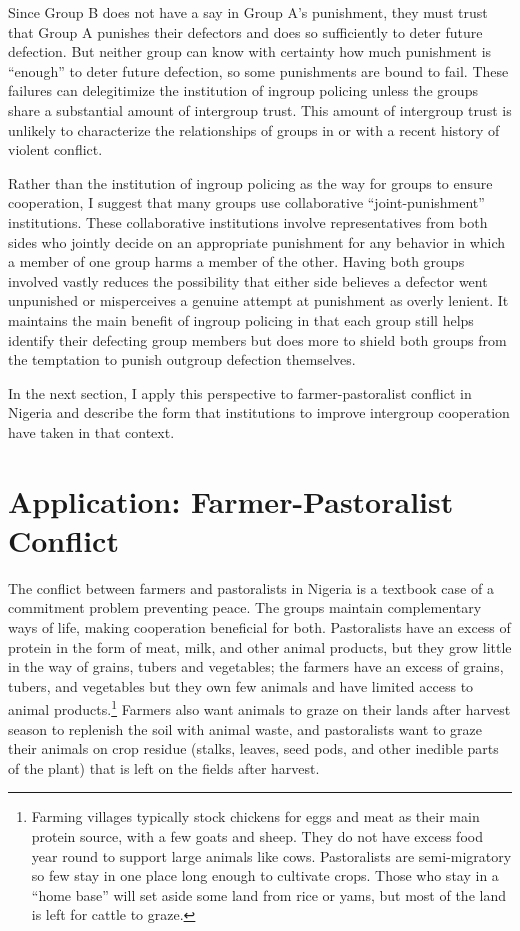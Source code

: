 \documentclass[11pt]{article}
\begin{document}
Since Group B does not have a say in Group A's punishment, they must
trust that Group A punishes their defectors and does so sufficiently to
deter future defection. But neither group can know with certainty how
much punishment is ``enough'' to deter future defection, so some
punishments are bound to fail. These failures can delegitimize the
institution of ingroup policing unless the groups share a substantial
amount of intergroup trust. This amount of intergroup trust is unlikely
to characterize the relationships of groups in or with a recent history
of violent conflict.

Rather than the institution of ingroup policing as the way for groups to
ensure cooperation, I suggest that many groups use collaborative
``joint-punishment'' institutions. These collaborative institutions
involve representatives from both sides who jointly decide on an
appropriate punishment for any behavior in which a member of one group
harms a member of the other. Having both groups involved vastly reduces
the possibility that either side believes a defector went unpunished or
misperceives a genuine attempt at punishment as overly lenient. It
maintains the main benefit of ingroup policing in that each group still
helps identify their defecting group members but does more to shield
both groups from the temptation to punish outgroup defection themselves.

In the next section, I apply this perspective to farmer-pastoralist
conflict in Nigeria and describe the form that institutions to improve
intergroup cooperation have taken in that context.

\hypertarget{application-farmer-pastoralist-conflict}{%
\section{Application: Farmer-Pastoralist
Conflict}\label{application-farmer-pastoralist-conflict}}

The conflict between farmers and pastoralists in Nigeria is a textbook
case of a commitment problem preventing peace. The groups maintain
complementary ways of life, making cooperation beneficial for both.
Pastoralists have an excess of protein in the form of meat, milk, and
other animal products, but they grow little in the way of grains, tubers
and vegetables; the farmers have an excess of grains, tubers, and
vegetables but they own few animals and have limited access to animal
products.\footnote{Farming villages typically stock chickens for eggs
  and meat as their main protein source, with a few goats and sheep.
  They do not have excess food year round to support large animals like
  cows. Pastoralists are semi-migratory so few stay in one place long
  enough to cultivate crops. Those who stay in a ``home base'' will set
  aside some land from rice or yams, but most of the land is left for
  cattle to graze.} Farmers also want animals to graze on their lands
after harvest season to replenish the soil with animal waste, and
pastoralists want to graze their animals on crop residue (stalks,
leaves, seed pods, and other inedible parts of the plant) that is left
on the fields after harvest.
\end{document}
